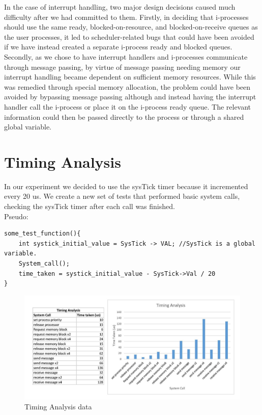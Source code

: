 \documentclass[11pt, oneside]{article}
\begin{document}
In the case of interrupt handling, two major design decisions caused much difficulty after we had committed to them. Firstly, in deciding that i-processes should use the same ready, blocked-on-resource, and blocked-on-receive queues as the user processes, it led to scheduler-related bugs that could have been avoided if we have instead created a separate i-process ready and blocked queues. Secondly, as we chose to have interrupt handlers and i-processes communicate through message passing, by virtue of message passing needing memory our interrupt handling became dependent on sufficient memory resources. While this was remedied through special memory allocation, the problem could have been avoided by bypassing message passing although and instead having the interrupt handler call the i-process or place it on the i-process ready queue. The relevant information could then be passed directly to the process or through a shared global variable.

\section{Timing Analysis}
In our experiment we decided to use the sysTick timer because it incremented every 20 us. We create a new set of tests that performed basic system calls, checking the sysTick timer after each call was finished.  \\
\newline
Pseudo:
\begin{verbatim}
some_test_function(){
	int systick_initial_value = SysTick -> VAL; //SysTick is a global variable.
	System_call();
	time_taken = systick_initial_value - SysTick->Val / 20
}
\end{verbatim}

\begin{figure}[ht!]
\centering
\includegraphics[width=170mm]{TimingAnalysisGraph.jpg}
\caption{Timing Analysis data \label{overflow}}
\end{figure}
\end{document}
